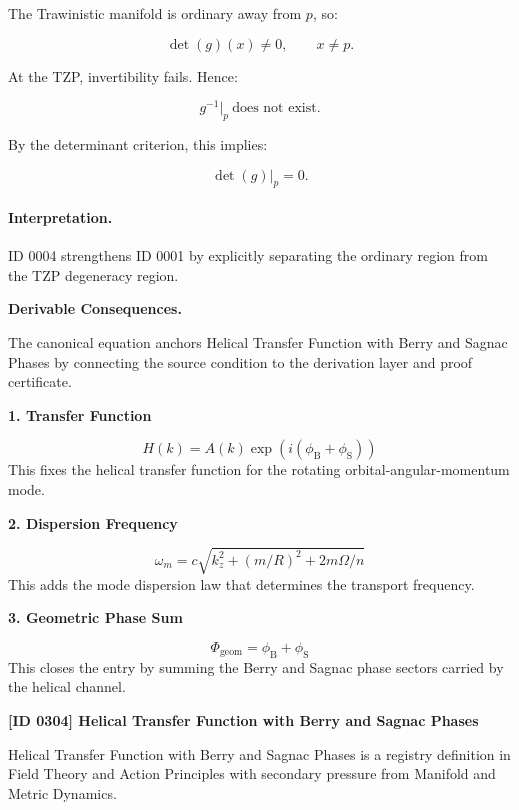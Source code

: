 The Trawinistic manifold is ordinary away from $p$, so:

\begin{equation}
\det(g)(x)\neq 0,
\qquad x\neq p .
\end{equation}

At the TZP, invertibility fails. Hence:

\begin{equation}
g^{-1}\big|_p \ \text{does not exist}.
\end{equation}

By the determinant criterion, this implies:

\begin{equation}
\det(g)\big|_p=0 .
\end{equation}

\paragraph{Interpretation.}
ID 0004 strengthens ID 0001 by explicitly separating the ordinary region from the TZP degeneracy region.

\par\vspace{0.35em}
\noindent\textbf{Derivable Consequences.}\quad
\begingroup
\footnotesize
\raggedright
The canonical equation anchors Helical Transfer Function with Berry and Sagnac Phases by connecting the source condition to the derivation layer and proof certificate.
\par\endgroup

\noindent\textbf{1. Transfer Function}\par
\[
H(k)=A(k)\exp\!\left(i(\phi_{\mathrm{B}}+\phi_{\mathrm{S}})\right)
\]
\noindent This fixes the helical transfer function for the rotating orbital-angular-momentum mode.\par
\noindent\textbf{2. Dispersion Frequency}\par
\[
\omega_m=c\sqrt{k_z^2+(m/R)^2+2m\Omega/n}
\]
\noindent This adds the mode dispersion law that determines the transport frequency.\par
\noindent\textbf{3. Geometric Phase Sum}\par
\[
\Phi_{\mathrm{geom}}=\phi_{\mathrm{B}}+\phi_{\mathrm{S}}
\]
\noindent This closes the entry by summing the Berry and Sagnac phase sectors carried by the helical channel.\par

\clearpage
\noindent\textbf{[ID 0304] Helical Transfer Function with Berry and Sagnac Phases}\par
\vspace{0.35em}
\begingroup\small
{}
Helical Transfer Function with Berry and Sagnac Phases is a registry definition in Field Theory and Action Principles with secondary pressure from Manifold and Metric Dynamics.

